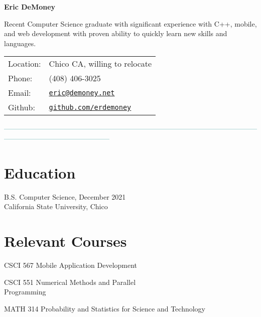 \documentclass[letterpaper]{article}
\def\name{Eric DeMoney}
\renewenvironment{itemize}{
  \begin{list}{}{
    \setlength{\leftmargin}{1.5em}
  }
}{
  \end{list}
}
\begin{document}
{\textbf{\huge \name}

\vspace{0.05in}

\begin{minipage}{0.475\linewidth}
   Recent Computer Science graduate with significant experience with C++, mobile, and web development with proven ability to quickly learn new skills and\\languages. 
\end{minipage}
\hspace{0.125cm}
\begin{minipage}{0.475\linewidth}
  \begin{tabular}{ll}
    Location: & Chico CA, willing to relocate\\
    Phone: & (408) 406-3025\\
    Email: & \href{mailto:eric@demoney.net}{\tt eric@demoney.net}\\
    Github: & \href{https://github.com/erdemoney}{\tt github.com/erdemoney}\\
  \end{tabular}
\end{minipage}

\vspace{0.1in}
\textcolor{teal}{---------------------------------------------------------------------------------------------------------------------------------------------------------}
\vspace{0.1in}

\begin{minipage}[t]{0.475\linewidth}
    \section*{Education}
    \begin{itemize}
    \item[$\bullet$] B.S. Computer Science, December 2021\\
        California State University, Chico
    \end{itemize}
    \section*{Relevant Courses}
    \begin{itemize}
        \item[$\bullet$] CSCI 567 Mobile Application Development
        \item[$\bullet$] CSCI 551 Numerical Methods and Parallel\\Programming
        \item[$\bullet$] MATH 314 Probability and Statistics for Science and Technology
    \end{itemize}
\end{minipage}
\hspace{0.5cm}
\begin{minipage}[t]{0.475\linewidth}

\end{minipage}}
\end{document}
